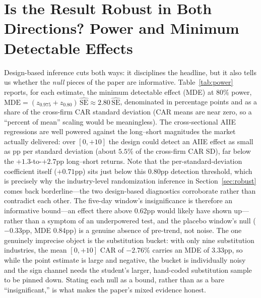 \documentclass[12pt]{article}
\begin{document}
\section{Is the Result Robust in Both Directions? Power and Minimum Detectable Effects}\label{sec:power}
Design-based inference cuts both ways: it disciplines the headline, but it also tells us whether
the \emph{null} pieces of the paper are informative. Table~\ref{tab:power} reports, for each
estimate, the minimum detectable effect (MDE) at $80\%$ power,
$\text{MDE}=(z_{0.975}+z_{0.80})\,\widehat{\text{SE}}\approx 2.80\,\widehat{\text{SE}}$,
denominated in percentage points and as a share of the cross-firm CAR standard deviation (CAR
means are near zero, so a ``percent of mean'' scaling would be meaningless). The cross-sectional
AIIE regressions are well powered against the long--short magnitudes the market actually
delivered: over $[0,+10]$ the design could detect an AIIE effect as small as \mdeTenDay{}pp per
standard deviation (about $5.5\%$ of the cross-firm CAR SD), far below the $+1.3$-to-$+2.7$pp
long--short returns. Note that the per-standard-deviation coefficient itself ($+0.71$pp) sits
just below this $0.80$pp detection threshold, which is precisely why the industry-level
randomization inference in Section~\ref{sec:robust} comes back borderline---the two design-based
diagnostics corroborate rather than contradict each other. The five-day window's
insignificance is therefore an informative bound---an effect there above $0.62$pp would likely
have shown up---rather than a symptom of an underpowered test, and the placebo window's null
($-0.33$pp, MDE $0.84$pp) is a genuine absence of pre-trend, not noise. The one genuinely
imprecise object is the substitution bucket: with only nine substitution industries, the mean
$[0,+10]$ CAR of $-2.76\%$ carries an MDE of $3.33$pp, so while the point estimate is large and
negative, the bucket is individually noisy and the sign channel needs the student's larger,
hand-coded substitution sample to be pinned down. Stating each null as a bound, rather than as a
bare ``insignificant,'' is what makes the paper's mixed evidence honest.
\end{document}
